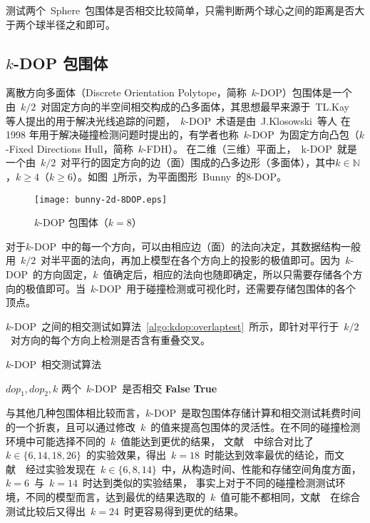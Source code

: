 测试两个~Sphere~包围体是否相交比较简单，只需判断两个球心之间的距离是否大于两个球半径之和即可。

\subsection{$k$-DOP 包围体}

离散方向多面体（Discrete Orientation Polytope，简称~$k$-DOP）包围体是一个由~$k/2$~对固定方向的半空间相交构成的凸多面体，其思想最早来源于~TL.Kay~\cite{Kay1986Ray}
等人提出的用于解决光线追踪的问题，~$k$-DOP~术语是由~J.Klosowski~等人\cite{klosowski1998efficient}
在1998 年用于解决碰撞检测问题时提出的，有学者也称~$k$-DOP~为固定方向凸包（$k$-Fixed
Directions Hull，简称~$k$-FDH）\cite{weiyingmei2001}。
在二维（三维）平面上，~k-DOP~就是一个由~$k/2$~对平行的固定方向的边（面）围成的凸多边形（多面体），其中$k\in\mathbb{N}$，$k\geq4$（$k\geq6$）。如图~\ref{fig:8dop-bunny}所示，为平面图形~Bunny~的$8$-DOP。
\begin{figure}[htbp] %
  \centering
  \texttt{[image: bunny-2d-8DOP.eps]}
  \caption{$k$-DOP 包围体（$k=8$）}
  \label{fig:8dop-bunny}
\end{figure}

对于$k$-DOP~中的每一个方向，可以由相应边（面）的法向决定，其数据结构一般用~$k/2$~对半平面的法向，再加上模型在各个方向上的投影的极值即可。因为~$k$-DOP~的方向固定，$k$~值确定后，相应的法向也随即确定，所以只需要存储各个方向的极值即可。当~$k$-DOP~用于碰撞检测或可视化时，还需要存储包围体的各个顶点。

$k$-DOP~之间的相交测试如算法~\ref{algo:kdop:overlaptest}~所示\cite{ericson2005real}，即针对平行于~$k/2$~对方向的每个方向上检测是否含有重叠交叉。
\begin{algorithm}
\caption{$k$-DOP~相交测试算法}
\small
\label{algo:kdop:overlaptest}
\begin{algorithmic}[1]
\Require
$dop_1, dop_2, k$ 
\Ensure
两个~$k$-DOP~是否相交
          \State \Return \textbf{False} 
      \EndIf
  \EndFor
  \State \Return \textbf{True} 
\EndFunction
\end{algorithmic}
\end{algorithm}
与其他几种包围体相比较而言，$k$-DOP~是取包围体存储计算和相交测试耗费时间的一个折衷，且可以通过修改~$k$~的值来提高包围体的灵活性。在不同的碰撞检测环境中可能选择不同的~$k$~值能达到更优的结果，
文献~~中综合对比了~$k \in \{6,14,18,26\}$~的实验效果，得出~$k=18$~时能达到效率最优的结论，而文献~~经过实验发现在~$k \in \{6,8,14\}$~中，从构造时间、性能和存储空间角度方面，$k=6$~与~$k=14$~时达到类似的实验结果，
事实上对于不同的碰撞检测测试环境，不同的模型而言，达到最优的结果选取的~$k$~值可能不都相同，文献~~在综合测试比较后又得出~$k=24$~时更容易得到更优的结果。

